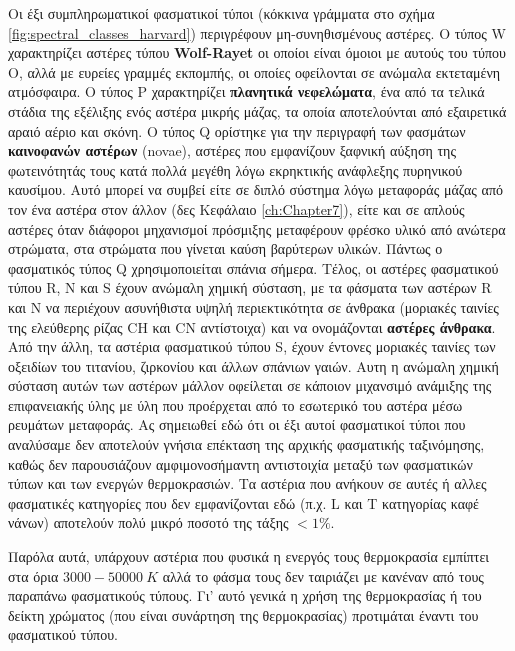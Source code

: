Οι έξι συμπληρωματικοί φασματικοί τύποι (κόκκινα γράμματα στο σχήμα \ref{fig:spectral_classes_harvard}) περιγρέφουν μη-συνηθισμένους αστέρες. Ο τύπος W χαρακτηρίζει αστέρες τύπου \textbf{Wolf-Rayet} οι οποίοι είναι όμοιοι με αυτούς του τύπου Ο, αλλά με ευρείες γραμμές εκπομπής, οι οποίες οφείλονται σε ανώμαλα εκτεταμένη ατμόσφαιρα.
Ο τύπος P χαρακτηρίζει \textbf{πλανητικά νεφελώματα}, ένα από τα τελικά στάδια της εξέλιξης ενός αστέρα μικρής μάζας, τα οποία αποτελούνται από εξαιρετικά αραιό αέριο και σκόνη.
Ο τύπος Q ορίστηκε για την περιγραφή των φασμάτων \textbf{καινοφανών αστέρων} (novae), αστέρες που εμφανίζουν ξαφνική αύξηση της φωτεινότητάς τους κατά πολλά μεγέθη λόγω εκρηκτικής ανάφλεξης πυρηνικού καυσίμου. Αυτό μπορεί να συμβεί είτε σε διπλό σύστημα λόγω μεταφοράς μάζας από τον ένα αστέρα στον άλλον (δες Κεφάλαιο \ref{ch:Chapter7}), είτε και σε απλούς αστέρες όταν διάφοροι μηχανισμοί πρόσμιξης μεταφέρουν φρέσκο υλικό από ανώτερα στρώματα, στα στρώματα που γίνεται καύση βαρύτερων υλικών. Πάντως ο φασματικός τύπος Q χρησιμοποιείται σπάνια σήμερα.
Τέλος, οι αστέρες φασματικού τύπου R, N και S έχουν ανώμαλη χημική σύσταση, με τα φάσματα των αστέρων R και N να περιέχουν ασυνήθιστα υψηλή περιεκτικότητα σε άνθρακα (μοριακές ταινίες της ελεύθερης ρίζας CH και CN αντίστοιχα) και να ονομάζονται \textbf{αστέρες άνθρακα}. Από την άλλη, τα αστέρια φασματικού τύπου S, έχουν έντονες μοριακές ταινίες των οξειδίων του τιτανίου, ζιρκονίου και άλλων σπάνιων γαιών. Αυτη η ανώμαλη χημική σύσταση αυτών των αστέρων μάλλον οφείλεται σε κάποιον μιχανσιμό ανάμιξης της επιφανειακής ύλης με ύλη που προέρχεται από το εσωτερικό του αστέρα μέσω ρευμάτων μεταφοράς. 
Ας σημειωθεί εδώ ότι οι έξι αυτοί φασματικοί τύποι που αναλύσαμε δεν αποτελούν γνήσια επέκταση της αρχικής φασματικής ταξινόμησης, καθώς δεν παρουσιάζουν αμφιμονοσήμαντη αντιστοιχία μεταξύ των φασματικών τύπων και των ενεργών θερμοκρασιών. Τα αστέρια που ανήκουν σε αυτές ή αλλες φασματικές κατηγορίες που δεν εμφανίζονται εδώ (π.χ. L και T κατηγορίας καφέ νάνων) αποτελούν πολύ μικρό ποσοτό της τάξης $< 1 \%$.

Παρόλα αυτά, υπάρχουν αστέρια που φυσικά η ενεργός τους θερμοκρασία εμπίπτει στα όρια $ 3000 - 50000 \ K$ αλλά το φάσμα τους δεν ταιριάζει με κανέναν από τους παραπάνω φασματικούς τύπους. Γι' αυτό γενικά η χρήση της θερμοκρασίας ή του δείκτη χρώματος (που είναι συνάρτηση της θερμοκρασίας) προτιμάται έναντι του φασματικού τύπου.




